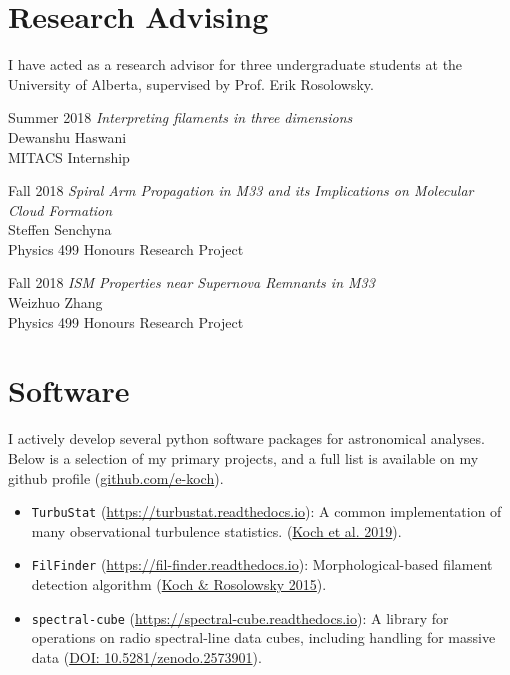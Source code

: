 \documentclass[letterpaper,11pt]{article}
\newlength{\mainindent} \setlength{\mainindent}{12pt}
\newlength{\contentindent} \setlength{\contentindent}{19ex}
\newenvironment{datelist}{
  \begingroup
  \raggedright
  \begin{description}[labelindent=\mainindent,leftmargin=\contentindent,
      style=sameline,font=\normalfont,topsep=0pt,partopsep=0pt,parsep=0pt,
      itemsep=4pt]
}{
  \end{description}
  \endgroup
}
\begin{document}
\section*{Research Advising}

I have acted as a research advisor for three undergraduate students at the University of Alberta, supervised by Prof. Erik Rosolowsky.
\vspace{0.1in}
\begin{datelist}
\item[Summer 2018]
  \emph{Interpreting filaments in three dimensions} \\
  Dewanshu Haswani \\
  MITACS Internship
\item[Fall 2018]
  \emph{Spiral Arm Propagation in M33 and its Implications on Molecular Cloud Formation} \\
  Steffen Senchyna \\
  Physics 499 Honours Research Project
\item[Fall 2018]
  \emph{ISM Properties near Supernova Remnants in M33} \\
  Weizhuo Zhang \\
  Physics 499 Honours Research Project
\end{datelist}

\section*{Software}
I actively develop several python software packages for astronomical analyses. Below is a selection of my primary projects, and a full list is available on my github profile (\url{github.com/e-koch}).
\begin{itemize}
\item \texttt{TurbuStat} (\url{https://turbustat.readthedocs.io}): A common implementation of many observational turbulence statistics. (\href{https://ui.adsabs.harvard.edu/abs/2019AJ....158....1K/abstract}{Koch et al. 2019}).
\item \texttt{FilFinder} (\url{https://fil-finder.readthedocs.io}): Morphological-based filament detection algorithm (\href{https://ui.adsabs.harvard.edu/abs/2015MNRAS.452.3435K/abstract}{Koch \& Rosolowsky 2015}).
\item \texttt{spectral-cube} (\url{https://spectral-cube.readthedocs.io}): A library for operations on radio spectral-line data cubes, including handling for massive data (\href{https://doi.org/10.5281/zenodo.2573901}{DOI: 10.5281/zenodo.2573901}).
\end{itemize}
\end{document}

